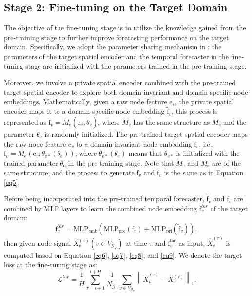 \documentclass[sigconf]{acmart}
\theoremstyle{definition}
\begin{document}
\subsection{Stage 2: Fine-tuning on the Target Domain}

The objective of the fine-tuning stage is to utilize the knowledge gained from the pre-training stage to further improve forecasting performance on the target domain. 
Specifically, we adopt the parameter sharing mechanism in \cite{pan2009survey}: the parameters of the target spatial encoder and the temporal forecaster in the fine-tuning stage are initialized with the parameters trained in the pre-training stage.

Moreover, we involve a private spatial encoder combined with the pre-trained target spatial encoder to explore both domain-invariant and domain-specific node embeddings. Mathematically, given a raw node feature $\mathrm{e}_v$, the private spatial encoder maps it to a domain-specific node embedding $\tilde{\mathrm{f}}_v$, this process is represented as $\tilde{\mathrm{f}}_v=\tilde{M}_{\mathrm{e}}(\mathrm{e}_v;\tilde{\theta}_{\mathrm{e}})$, where $\tilde{M}_{\mathrm{e}}$ has the same structure as $M_{\mathrm{e}}$ and the parameter $\tilde{\theta}_{\mathrm{e}}$ is randomly initialized. The pre-trained target spatial encoder maps the raw node feature $\mathrm{e}_v$ to a domain-invariant node embedding $\mathrm{f}_v$, i.e., $\mathrm{f}_v=M_{\mathrm{e}}(\mathrm{e}_v;\theta_{\mathrm{e}*}(\theta_{\mathrm{e}}))$, where $\theta_{\mathrm{e}*}(\theta_{\mathrm{e}})$ means that $\theta_{\mathrm{e}*}$ is initialized with the trained parameter $\theta_{\mathrm{e}}$ in the pre-training stage. Note that $\tilde{M}_{\mathrm{e}}$ and $M_{\mathrm{e}}$  are of the same structure, and the process to generate $\tilde{\mathrm{f}}_v$ and $\mathrm{f}_v$ is the same as in Equation \ref{eq5}.

Before being incorporated into the pre-trained temporal forecaster,   $\tilde{\mathrm{f}}_v$ and $\mathrm{f}_v$ are combined by $\mathrm{MLP}$ layers to learn the combined node embedding $\mathrm{f}_v^{tar}$ of the target domain:
\begin{equation}\label{eq12}
    \mathrm{f}_v^{tar}=\mathrm{{MLP}_{cmb}}\left(\mathrm{{MLP}_{pre}}(\mathrm{f}_v) + \mathrm{{MLP}_{pri}}(\tilde{\mathrm{f}}_v)\right),
\end{equation}
then given node signal $X_{v}^{(\tau)}(v \in V_{\mathcal{G}_T})$ at time $\tau$ and $\mathrm{f}_v^{\mathrm{tar}}$ as input, $\widehat{X}_v^{(\tau)}$ is computed based on Equation \ref{eq6}, \ref{eq7}, \ref{eq8}, and \ref{eq9}. We denote the target loss at the fine-tuning stage as:
\begin{equation}\label{eq13}
    \mathcal{L}^{tar}=\frac{1}{H}\sum_{\tau=t+1}^{t+H}\frac{1}{N_{\mathcal{G}_T}}\sum_{v \in V_{\mathcal{G}_{T}}}\left\|\widehat{X}^{(\tau)}_{v}-X^{(\tau)}_{v}\right\|_{1}.
\end{equation}
\end{document}

